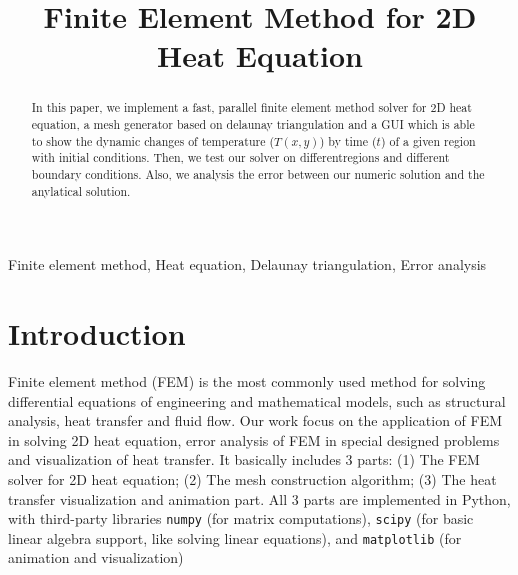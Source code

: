 \documentclass[conference]{IEEEtran}
\begin{document}
\title{
    Finite Element Method for 2D Heat Equation
}

\author{
\and
{}
}

\maketitle

\begin{abstract}
In this paper, we implement a fast, parallel finite element method solver for 2D heat 
equation, a mesh generator based on delaunay triangulation and a GUI which is able to 
show the dynamic changes of temperature ($T(x, y)$) by time ($t$) of a given region with 
initial conditions. Then, we test our solver on differentregions and different boundary 
conditions. Also, we analysis the error between our numeric solution and the anylatical solution.
\end{abstract}

\begin{IEEEkeywords}
Finite element method, Heat equation, Delaunay triangulation, Error analysis
\end{IEEEkeywords}


\section{Introduction}
Finite element method (FEM) is the most commonly used method for solving differential equations of 
engineering and mathematical models, such as structural analysis, heat transfer and fluid flow\cite{b1}.
Our work focus on the application of FEM in solving 2D heat equation, error analysis of 
FEM in special designed problems and visualization of heat transfer. It basically 
includes 3 parts: (1) The FEM solver for 2D heat equation; (2) The mesh construction algorithm; 
(3) The heat transfer visualization and animation part. All 3 parts are implemented in Python, 
with third-party libraries \texttt{numpy}\cite{b8} (for matrix computations), \texttt{scipy}\cite{b10} (for basic 
linear algebra support, like solving linear equations), and \texttt{matplotlib}\cite{b9} (for animation 
and visualization)
\end{document}
